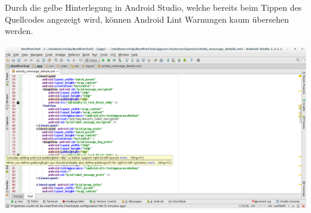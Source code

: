 Durch die gelbe Hinterlegung in Android Studio, welche bereits beim Tippen des Quellcodes angezeigt wird, können Android Lint Warnungen kaum übersehen werden.

\includegraphics[width=17.5cm]{belege/lint/android-lint-screenshot.png}
